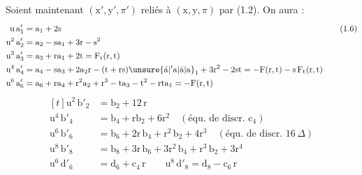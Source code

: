 Soient maintenant $(\mathrm{x}',\mathrm{y}',\pi')$ reliés à $(\mathrm{x},\mathrm{y},\pi)$ par (1.2). On aura :
\[
\begin{aligned}[t]
\mathrm{u}\,\mathrm{a}'_{1}&=\mathrm{a}_{1}+2\mathrm{s}\\
\mathrm{u}^{2}\,\mathrm{a}'_{2}&=\mathrm{a}_{2}-\mathrm{sa}_{1}+3\mathrm{r}-\mathrm{s}^{2}\\
\mathrm{u}^{3}\,\mathrm{a}'_{3}&=\mathrm{a}_{3}+\mathrm{ra}_{1}+2\mathrm{t}=\mathrm{F}_{\mathrm{t}}(\mathrm{r},\mathrm{t})\\
\mathrm{u}^{4}\,\mathrm{a}'_{4}&=\mathrm{a}_{4}-\mathrm{sa}_{3}+2\mathrm{a}_{2}\mathrm{r}-(\mathrm{t}+\mathrm{rs})\unsure{\acute{\mathrm{a}}|{}'\mathrm{a}|\dot{\mathrm{a}}|\mathrm{a}}_{1}+3\mathrm{r}^{2}-2\mathrm{st}
=-\mathrm{F}(\mathrm{r},\mathrm{t})-\mathrm{s}\,\mathrm{F}_{\mathrm{t}}(\mathrm{r},\mathrm{t})\\
\mathrm{u}^{6}\,\mathrm{a}'_{6}&=\mathrm{a}_{6}+\mathrm{ra}_{4}+\mathrm{r}^{2}\mathrm{a}_{2}+\mathrm{r}^{3}-\mathrm{ta}_{3}-\mathrm{t}^{2}-\mathrm{rta}_{1}=-\mathrm{F}(\mathrm{r},\mathrm{t})
\end{aligned}
\tag*{(1.6)}
\]
\[
\begin{aligned}[t]
\mathrm{u}^{2}\,\mathrm{b}'_{2}&=\mathrm{b}_{2}+12\,\mathrm{r}\\
\mathrm{u}^{4}\,\mathrm{b}'_{4}&=\mathrm{b}_{4}+\mathrm{rb}_{2}+6\mathrm{r}^{2}\quad(\text{équ. de discr. }\mathrm{c}_{4})\\
\mathrm{u}^{6}\,\mathrm{b}'_{6}&=\mathrm{b}_{6}+2\mathrm{r}\,\mathrm{b}_{4}+\mathrm{r}^{2}\,\mathrm{b}_{2}+4\mathrm{r}^{3}\quad(\text{équ. de discr. }16\,\Delta)\\
\mathrm{u}^{8}\,\mathrm{b}'_{8}&=\mathrm{b}_{8}+3\mathrm{r}\,\mathrm{b}_{6}+3\mathrm{r}^{2}\,\mathrm{b}_{4}+\mathrm{r}^{3}\,\mathrm{b}_{2}+3\mathrm{r}^{4}\\
\mathrm{u}^{6}\,\mathrm{d}'_{6}&=\mathrm{d}_{6}+\mathrm{c}_{4}\,\mathrm{r}\qquad\mathrm{u}^{8}\,\mathrm{d}'_{8}=\mathrm{d}_{8}-\mathrm{c}_{6}\,\mathrm{r}
\end{aligned}
\tag*{(1.7)}
\]
\clearpage
